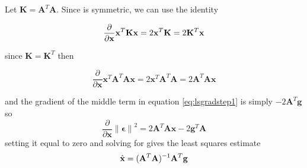 Let $\mathbf{K} = \mathbf{A}^T \mathbf{A}$. Since  is symmetric, we can use the identity

\begin{equation}
\dfrac {\partial } {\partial \mathbf{x} }  \mathbf{x}^{T} \mathbf{K} \mathbf{x} = 2 \mathbf{x}^T \mathbf{K} = 2 \mathbf{K}^T \mathbf{x}
\end{equation}

since $\mathbf{K}=\mathbf{K}^T$ then 

\begin{equation}
\dfrac {\partial } {\partial \mathbf{x} }  \mathbf{x}^{T} \mathbf{A}^{T} \mathbf{A} \mathbf{x}  = 2 \mathbf{x}^T \mathbf{A}^T \mathbf{A} = 2 \mathbf{A}^T \mathbf{A} \mathbf{x}
\end{equation}



and the gradient of the middle term in equation \ref{eq:lsgradstep1} is simply $- 2 \mathbf{A}^{T} \mathbf{g}$ so 
\begin{equation}
\dfrac {\partial } {\partial \mathbf{x} } \mathbf{ \lVert \mathbf{\epsilon} \rVert }^2  = 2 \mathbf{A}^T \mathbf{A} \mathbf{x} - 2 \mathbf{g}^{T} \mathbf{A}
\end{equation}
setting it equal to zero and solving for  gives the least squares estimate
\begin{equation}
	\hat{ \mathbf{x} } = ( \mathbf{A}^T \mathbf{A} )^{-1} \mathbf{A}^T \mathbf{g}
\end{equation}
